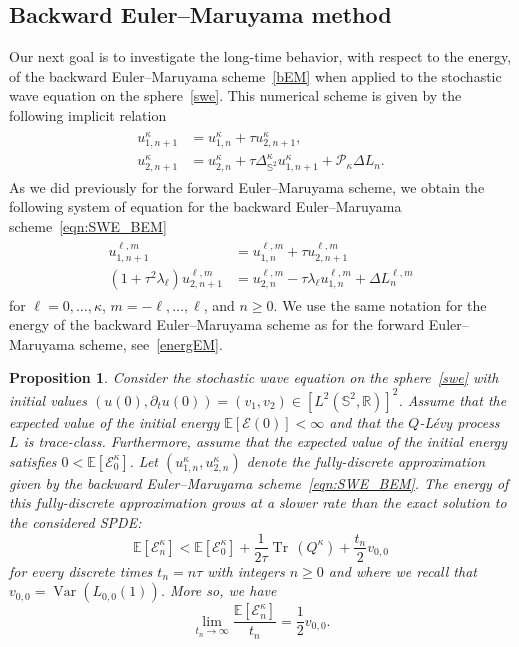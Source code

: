\documentclass[10pt,a4paper]{amsart}
\newtheorem{proposition}{Proposition}
\newcommand{\Deltalb}{\Delta_{\IS^2}}
\newcommand{\E}{{\mathbb E}}
\newcommand{\IS}{\mathbb{S}}
\newcommand{\R}{{\mathbb R}}
\DeclareMathOperator{\Var}{Var}
\newcommand{\cE}{\mathcal E}
\newcommand{\cP}{\mathcal{P}}
\newcommand{\tr}{{\operatorname{Tr}\, }}
\begin{document}
\subsection{Backward Euler--Maruyama method}
Our next goal is to investigate the long-time behavior, with respect to the energy, of the backward Euler--Maruyama scheme~\eqref{bEM} when applied to the stochastic wave equation on the sphere~\eqref{swe}. This numerical scheme is given by the following implicit relation
\begin{align}
\begin{split}
    \label{eqn:SWE_BEM}
    u_{1,n+1}^\kappa&=u_{1,n}^\kappa+\tau u_{2,n+1}^\kappa,\\
    u_{2,n+1}^\kappa&=u_{2,n}^\kappa+\tau \Deltalb^\kappa u_{1,n+1}^\kappa+\cP_\kappa\Delta L_n.
\end{split}
\end{align}
As we did previously for the forward Euler--Maruyama scheme, we obtain the following system of equation for the backward Euler--Maruyama scheme~\eqref{eqn:SWE_BEM}
\begin{align}
    \begin{split}
    \label{eqn:SWE_BEM2}
    u_{1,n+1}^{\ell, m} &= u_{1, n}^{\ell, m} + \tau u_{2, n+1}^{\ell, m}\\
    \left(1+\tau^2\lambda_\ell\right)u_{2,n+1}^{\ell, m} &= u_{2, n}^{\ell, m} - \tau\lambda_\ell u_{1, n}^{\ell, m} + \Delta L^{\ell, m}_n
    \end{split}
\end{align}
for $\ell=0,\ldots,\kappa$, $m=-\ell,\ldots,\ell$, and $n\geq 0$. We use the same notation for the energy of the backward Euler--Maruyama scheme as
for the forward Euler--Maruyama scheme, see~\eqref{energEM}.

\begin{proposition}\label{prop:energy-bem}
Consider the stochastic wave equation on the sphere~\eqref{swe} with initial values $(u(0),\partial_tu(0))=(v_1,v_2)\in [L^2(\IS^2,\R)]^2$.
Assume that the expected value of the initial energy $\E\left[\mathcal{E}(0)\right]<\infty$ and that the $Q$-L\'evy process $L$ is trace-class.
Furthermore, assume that the expected value of the initial energy satisfies $0<\E\left[\mathcal{E}^\kappa_0\right]$.
Let $\left(u_{1,n}^\kappa, u_{2,n}^\kappa\right)$ denote the fully-discrete approximation given by the backward Euler--Maruyama scheme~\eqref{eqn:SWE_BEM}.
The energy of this fully-discrete approximation grows at a slower rate than the exact solution to the considered SPDE:
\begin{equation*}
		\E\left[\cE^\kappa_n\right] <
         \E\left[\cE^\kappa_0\right]+ \frac{1}{2\tau}\tr\left(Q^\kappa\right) + \frac {t_n} {2} v_{0,0}
\end{equation*}
for every discrete times $t_n=n\tau$ with integers $n\geq0$ and where we recall that $v_{0,0}=\Var(L_{0,0}(1))$. More so, we have
\begin{equation}\label{eqn:SWE_energy_BEM_limit}
    \lim_{t_n\to\infty}\frac{\E\left[\mathcal{E}^\kappa_n\right]}{t_n}=\frac 1 2 v_{0,0}.
\end{equation}
\end{proposition}
\end{document}
